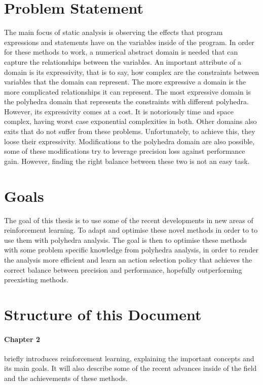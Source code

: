\section{Problem Statement}
The main focus of static analysis is observing the effects that program expressions and statements have on the variables inside of the program. In order for these methods to work, a numerical abstract domain is needed that can capture the relationships between the variables. An important attribute of a domain is its expressivity, that is to say, how complex are the constraints between variables that the domain can represent. The more expressive a domain is the more complicated relationships it can represent. The most expressive domain is the polyhedra domain that represents the constraints with different polyhedra. However, its expressivity comes at a cost. It is notoriously time and space complex, having worst case exponential complexities in both. Other domains also exits that do not suffer from these problems. Unfortunately, to achieve this, they loose their expressivity. Modifications to the polyhedra domain are also possible, some of these modifications try to leverage precision loss against performance gain. However, finding the right balance between these two is not an easy task.

\section{Goals}
The goal of this thesis is to use some of the recent developments in new areas of reinforcement learning. To adapt and optimise these novel methods in order to to use them with polyhedra analysis. The goal is then to optimise these methods with some problem specific knowledge from polyhedra analysis, in order to render the analysis more efficient and learn an action selection policy that achieves the correct balance between precision and performance, hopefully outperforming preexisting methods.


\section{Structure of this Document}

\paragraph{Chapter 2}briefly introduces reinforcement learning, explaining the important concepts and its main goals. It will also describe some of the recent advances inside of the field and the achievements of these methods.

